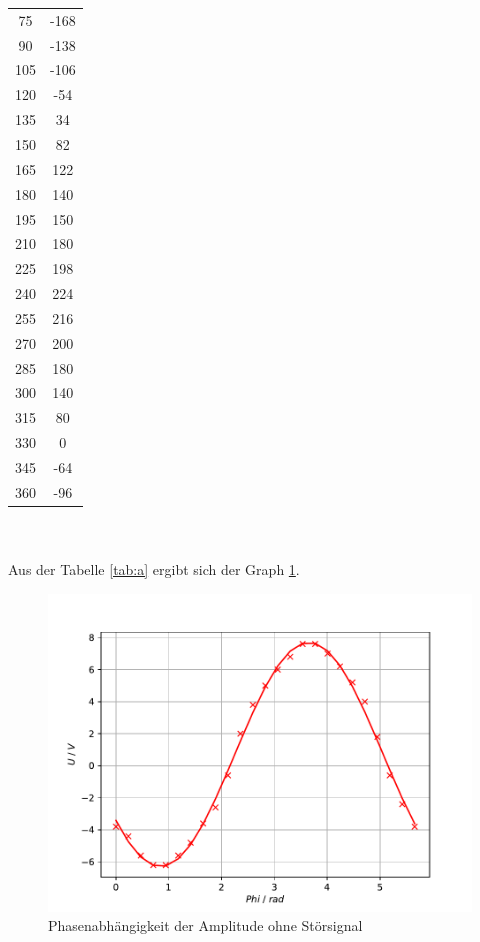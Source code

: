 \begin{table}
\begin{minipage}{0.5\textwidth}
\begin{tabular}{c|c}
		75 & -168 \\
		90 & -138\\
		105 & -106 \\
		120 & -54\\
		135 & 34 \\
		150 & 82 \\
		165 & 122 \\
		180 & 140\\
		195 & 150\\
		210 & 180\\
		225 & 198\\
		240 & 224 \\
		255 & 216\\
		270 & 200\\
		285 & 180\\
		300 & 140\\
		315 & 80\\
		330 & 0 \\
		345 & -64 \\
		360 & -96 \\
		\bottomrule 
	\end{tabular}
\end{minipage}
\end{table}
\\
\\
Aus der Tabelle \ref{tab:a} ergibt sich der Graph \ref{fig:sinus}.
\begin{figure}[h]
	\centering
	\includegraphics{Sinus.pdf}
	\caption{Phasenabhängigkeit der Amplitude ohne Störsignal}
	\label{fig:sinus}
\end{figure}

